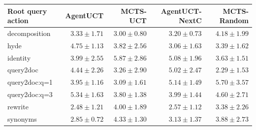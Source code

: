 \begin{tabular}{@{}lrrrr@{}}
\toprule
Root query action & AgentUCT & MCTS-UCT & AgentUCT-NextC & MCTS-Random \\
\midrule
decomposition & $3.33 \pm 1.71$ & $3.00 \pm 0.80$ & $3.20 \pm 0.73$ & $4.18 \pm 1.99$ \\
hyde & $4.75 \pm 1.13$ & $3.82 \pm 2.56$ & $3.06 \pm 1.63$ & $3.39 \pm 1.62$ \\
identity & $3.99 \pm 2.55$ & $5.87 \pm 2.86$ & $5.08 \pm 1.96$ & $3.63 \pm 1.51$ \\
query2doc & $4.44 \pm 2.26$ & $3.26 \pm 2.90$ & $5.02 \pm 2.47$ & $2.29 \pm 1.53$ \\
query2doc:q=1 & $3.95 \pm 1.16$ & $3.09 \pm 1.61$ & $5.14 \pm 1.49$ & $5.70 \pm 3.57$ \\
query2doc:q=3 & $5.34 \pm 1.63$ & $3.80 \pm 1.38$ & $3.99 \pm 1.44$ & $4.60 \pm 2.71$ \\
rewrite & $2.48 \pm 1.21$ & $4.00 \pm 1.89$ & $2.57 \pm 1.12$ & $3.38 \pm 2.26$ \\
synonyms & $2.85 \pm 0.72$ & $4.33 \pm 1.30$ & $3.13 \pm 1.37$ & $3.88 \pm 2.73$ \\
\bottomrule
\end{tabular}
